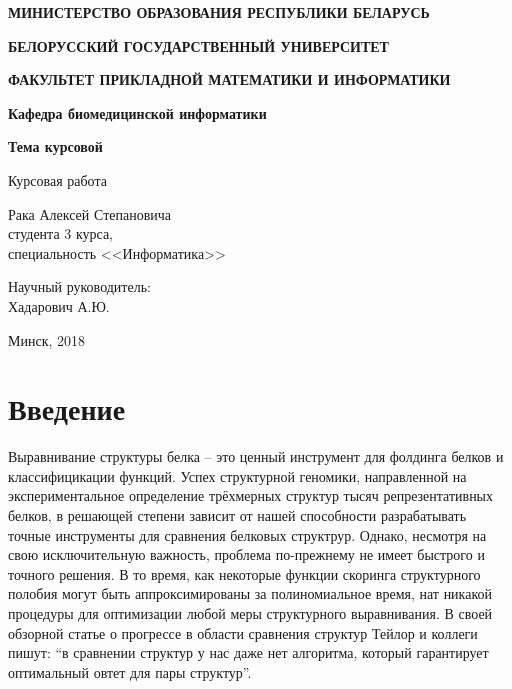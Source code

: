 \documentclass[a4papper]{article}
\begin{document}
\begin{titlepage}
\begin{center}
    \large
    \textbf{МИНИСТЕРСТВО ОБРАЗОВАНИЯ РЕСПУБЛИКИ БЕЛАРУСЬ}
    \vspace{0.25cm}

    \textbf{БЕЛОРУССКИЙ ГОСУДАРСТВЕННЫЙ УНИВЕРСИТЕТ}
    \vspace{0.25cm}

    \textbf{ФАКУЛЬТЕТ ПРИКЛАДНОЙ МАТЕМАТИКИ И ИНФОРМАТИКИ}

    \textbf{Кафедра биомедицинской информатики}
    \vfill


    \textbf{Тема курсовой}
    \vfill

    Курсовая работа

\end{center}
\vfill

\newlength{\ML}
\hfill\begin{minipage}{0.45\textwidth}
    Рака Алексей Степановича\\
    студента 3 курса,\\
    специальность <<Информатика>>
    \vspace{0.25cm}

    Научный руководитель:\\
    Хадарович А.Ю.
\end{minipage}
\bigskip


\begin{center}
    Минск, 2018
\end{center}

\end{titlepage}
\section{ Введение }
Выравнивание структуры белка – это ценный инструмент для фолдинга белков и классифицикации функций. Успех структурной геномики, направленной на экспериментальное определение трёхмерных структур тысяч репрезентативных белков, в решающей степени зависит от нашей способности разрабатывать точные инструменты для сравнения белковых структрур. Однако, несмотря на свою исключительную важность, проблема по-прежнему не имеет быстрого и точного решения. В то время, как некоторые функции скоринга структурного полобия могут быть аппроксимированы за полиномиальное время, нат никакой процедуры для оптимизации любой меры структурного выравнивания. В своей обзорной статье о прогрессе в области сравнения структур Тейлор и коллеги пишут: “в сравнении структур у нас даже нет алгоритма, который гарантирует оптимальный овтет для пары структур”.
\end{document}
